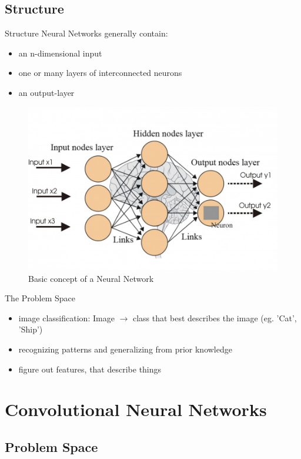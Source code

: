\documentclass[12pt]{beamer}
\begin{document}
\subsection{Structure}
\begin{frame}{Structure}
Neural Networks generally contain:
  \begin{itemize}
     \item an n-dimensional input 
     \item one or many layers of interconnected neurons
     \item an output-layer
  \end{itemize}
\begin{figure}
\centering
\includegraphics[width=0.5\linewidth]{images/principle.jpg}
\caption{Basic concept of a Neural Network}
\label{fig:principle}

\end{figure}

\end{frame}

\begin{frame}{The Problem Space}
  \begin{itemize}
  \item image classification: Image $\rightarrow$ class that best describes the image (eg. 'Cat', 'Ship')
  \item recognizing patterns and generalizing from prior knowledge 
  \item figure out features, that describe things
  \end{itemize}
\end{frame}

\section{Convolutional Neural Networks}
\subsection{Problem Space}
\end{document}
